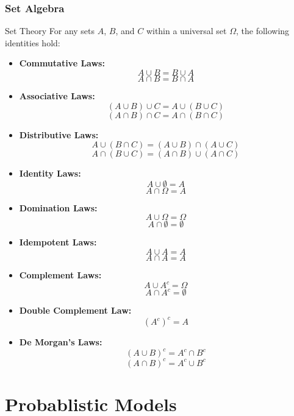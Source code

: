 
\subsubsection{Set Algebra}

\begin{identitiesboxbreak}{Set Theory}
For any sets \( A \), \( B \), and \( C \) within a universal set \( \Omega \), the following identities hold:
\begin{itemize}
    \item \textbf{Commutative Laws:}
    \[ A \cup B = B \cup A \]
    \[ A \cap B = B \cap A \]
    \item \textbf{Associative Laws:}
    \[ (A \cup B) \cup C = A \cup (B \cup C) \]
    \[ (A \cap B) \cap C = A \cap (B \cap C) \]
    \item \textbf{Distributive Laws:}
    \[ A \cup (B \cap C) = (A \cup B        ) \cap (A \cup C) \]
    \[ A \cap (B \cup C) = (A \cap B) \cup (A \cap C) \]
    \item \textbf{Identity Laws:}
    \[ A \cup \emptyset = A \]
    \[ A \cap \Omega = A \]
    \item \textbf{Domination Laws:}
    \[ A \cup \Omega = \Omega \]        
    \[ A \cap \emptyset = \emptyset \]      
    \item \textbf{Idempotent Laws:}
    \[ A \cup A = A \]
    \[ A \cap A = A \]
    \item \textbf{Complement Laws:}
    \[ A \cup A^c = \Omega \]
    \[ A \cap A^c = \emptyset \]
    \item \textbf{Double Complement Law:}
    \[ (A^c)^c = A \]
    \item \textbf{De Morgan's Laws:}
    \[ (A \cup B)^c = A^c \cap B^c \]
    \[ (A \cap B)^c = A^c \cup B^c \]
\end{itemize}
\end{identitiesboxbreak}

\section{Probablistic Models}


